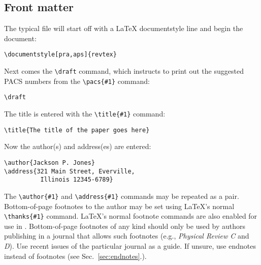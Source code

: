 \subsection{Front matter}
\label{sec:front}

The typical file will start off with a \LaTeX{} documentstyle line and
begin the document:
\begin{verbatim}
\documentstyle[pra,aps]{revtex}

\end{verbatim}
Next comes the \verb+\draft+ command, which instructs \REVTeX{} to print
out the suggested PACS numbers from the \verb+\pacs{#1}+ command:
\begin{verbatim}
\draft
\end{verbatim}
The title is entered with the \verb+\title{#1}+ command:
\begin{verbatim}
\title{The title of the paper goes here}
\end{verbatim}
Now the author(s) and address(es) are entered:
\begin{verbatim}
\author{Jackson P. Jones}
\address{321 Main Street, Everville,
          Illinois 12345-6789}
\end{verbatim}
The \verb+\author{#1}+ and \verb+\address{#1}+ commands may be repeated as
a pair. Bottom-of-page footnotes to the author may be set using \LaTeX's
normal \verb+\thanks{#1}+ command. \LaTeX's normal footnote commands are
also enabled for use in \REVTeX{}. Bottom-of-page footnotes of any kind
should only be used by authors publishing in a journal that allows such
footnotes (e.g., {\em Physical Review C\/} and {\em D\/}). Use recent
issues of the particular journal as a guide. If unsure, use endnotes
instead of footnotes (see Sec.\ \ref{sec:endnotes}.).



